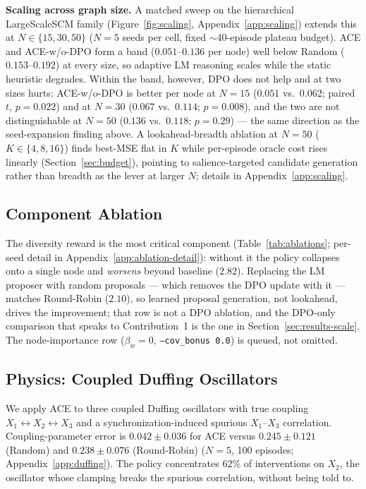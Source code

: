 \documentclass[twoside]{article}
\theoremstyle{plain}
\theoremstyle{definition}
\theoremstyle{remark}
\begin{document}
\textbf{Scaling across graph size.} A matched sweep on the hierarchical LargeScaleSCM family (Figure~\ref{fig:scaling}, Appendix~\ref{app:scaling}) extends this at $N\in\{15,30,50\}$ ($N{=}5$ seeds per cell, fixed $\sim$40-episode plateau budget). ACE and ACE-w/o-DPO form a band ($0.051$--$0.136$ per node) well below Random ($0.153$--$0.192$) at every size, so adaptive LM reasoning scales while the static heuristic degrades. Within the band, however, DPO does not help and at two sizes hurts: ACE-w/o-DPO is better per node at $N{=}15$ ($0.051$ vs.\ $0.062$; paired $t$, $p=0.022$) and at $N{=}30$ ($0.067$ vs.\ $0.114$; $p=0.008$), and the two are not distinguishable at $N{=}50$ ($0.136$ vs.\ $0.118$; $p=0.29$) --- the same direction as the seed-expansion finding above. A lookahead-breadth ablation at $N{=}50$ ($K\in\{4,8,16\}$) finds best-MSE flat in $K$ while per-episode oracle cost rises linearly (Section~\ref{sec:budget}), pointing to salience-targeted candidate generation rather than breadth as the lever at larger $N$; details in Appendix~\ref{app:scaling}.

\subsection{Component Ablation}
\label{sec:results-ablation}



The diversity reward is the most critical component (Table~\ref{tab:ablations}; per-seed detail in Appendix~\ref{app:ablation-detail}): without it the policy collapses onto a single node and \emph{worsens} beyond baseline ($2.82$). Replacing the LM proposer with random proposals --- which removes the DPO update with it --- matches Round-Robin ($2.10$), so learned proposal generation, not lookahead, drives the improvement; that row is not a DPO ablation, and the DPO-only comparison that speaks to Contribution~1 is the one in Section~\ref{sec:results-scale}. The node-importance row ($\beta_w=0$, \texttt{--cov\_bonus 0.0}) is queued, not omitted.

\subsection{Physics: Coupled Duffing Oscillators}
\label{sec:results-duffing}

We apply ACE to three coupled Duffing oscillators \citep{kovacic2011duffing} with true coupling $X_1 \leftrightarrow X_2 \leftrightarrow X_3$ and a synchronization-induced spurious $X_1$--$X_3$ correlation. Coupling-parameter error is $0.042\pm0.036$ for ACE versus $0.245\pm0.121$ (Random) and $0.238\pm0.076$ (Round-Robin) ($N{=}5$, 100 episodes; Appendix~\ref{app:duffing}). The policy concentrates $62\%$ of interventions on $X_2$, the oscillator whose clamping breaks the spurious correlation, without being told to.
\end{document}
